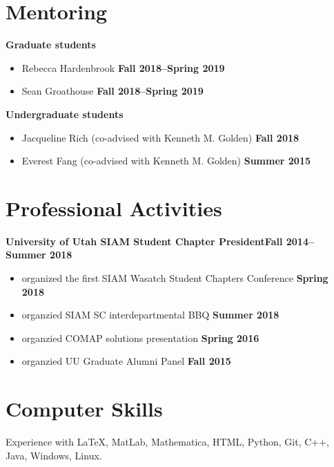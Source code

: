 \documentclass[margin,line]{res}
\begin{document}
\begin{resume}
\section{\sc Mentoring}
{\bf Graduate students}
\begin{itemize}
\item[ ] Rebecca Hardenbrook
\hfill {\bf Fall 2018--Spring 2019}
\item [] Sean Groathouse
\hfill {\bf Fall 2018--Spring 2019}
\end{itemize}
{\bf Undergraduate students}
\begin{itemize}
\item[ ] Jacqueline Rich (co-advised with Kenneth M. Golden) 
\hfill {\bf Fall 2018}
\item[ ] Everest Fang (co-advised with Kenneth M. Golden)
\hfill {\bf Summer 2015}
\end{itemize}

\section{\sc Professional Activities}
{\bf University of Utah SIAM Student Chapter President}\hfill{\bf Fall 2014--Summer 2018}\\
\begin{itemize}
\item[ ] organized the first SIAM Wasatch Student Chapters Conference \hfill {\bf Spring 2018}
\item[ ] organzied SIAM SC interdepartmental BBQ \hfill {\bf Summer 2018}
\item[ ] organzied COMAP solutions presentation \hfill {\bf Spring 2016}
\item[ ] organzied UU Graduate Alumni Panel \hfill {\bf Fall 2015}
\end{itemize}


\section{\sc Computer Skills} 
Experience with \LaTeX, MatLab, Mathematica, HTML, Python, Git, C++, Java, Windows, Linux.


\end{resume}
\end{document}
